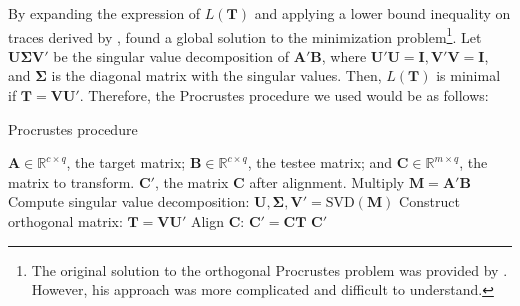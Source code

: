 By expanding the expression of $L(\mathbf{T})$ and applying a lower bound inequality on traces derived by \citet{Kristof1970}, \citet{tenBerge1993} found a global solution to the minimization problem\footnote{The original solution to the orthogonal Procrustes problem was provided by \citet{Green1952}. However, his approach was more complicated and difficult to understand.}. Let $\mathbf{U}\boldsymbol{\Sigma}\mathbf{V}'$ be the singular value decomposition of $\mathbf{A}' \mathbf{B}$, where $\mathbf{U}' \mathbf{U}=\mathbf{I}, \mathbf{V}' \mathbf{V}=\mathbf{I}$, and $\boldsymbol{\Sigma}$ is the diagonal matrix with the singular values. Then, $L(\mathbf{T})$ is minimal if $\mathbf{T} = \mathbf{V} \mathbf{U}'$. Therefore, the Procrustes procedure we used would be as follows:

\begin{algorithm}
    \caption{Procrustes procedure}
    \label{alg:Procrustes}
    
    \begin{algorithmic}[1]
        \REQUIRE $\mathbf{A} \in \mathbb{R}^{c \times q}$, the target matrix; $\mathbf{B} \in \mathbb{R}^{c \times q}$, the testee matrix; and $\mathbf{C} \in \mathbb{R}^{m \times q}$, the matrix to transform.
        \ENSURE $\mathbf{C}'$, the matrix $\mathbf{C}$ after alignment.
        \STATE Multiply $\mathbf{M} = \mathbf{A}' \mathbf{B}$
        \STATE Compute singular value decomposition: $\mathbf{U}, \boldsymbol{\Sigma}, \mathbf{V}' = \text{SVD}(\mathbf{M})$
        \STATE Construct orthogonal matrix: $\mathbf{T} = \mathbf{V} \mathbf{U}'$
        \STATE Align $\mathbf{C}$: $\mathbf{C}' = \mathbf{CT}$
        \RETURN $\mathbf{C}'$
    \end{algorithmic}
\end{algorithm}